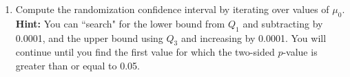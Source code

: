 \documentclass{article}\usepackage[]{graphicx}\usepackage[]{xcolor}
\begin{document}
\begin{enumerate}
\begin{enumerate}
  \item Compute the randomization confidence interval by iterating over values of $\mu_0$.\\
  \textbf{Hint:} You can ``search" for the lower bound from $Q_1$ and subtracting by 0.0001, 
  and the upper bound using $Q_3$ and increasing by 0.0001. You will continue until you find 
  the first value for which the two-sided $p$-value is greater than or equal to 0.05.
\end{enumerate}
\end{enumerate}

\end{document}
